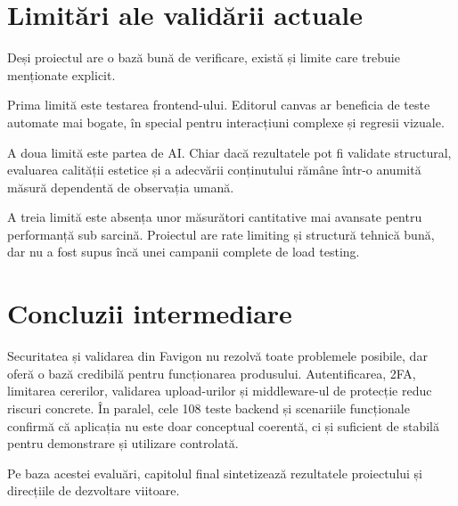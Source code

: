 \section{Limitări ale validării actuale}

Deși proiectul are o bază bună de verificare, există și limite care trebuie menționate explicit.

Prima limită este testarea frontend-ului. Editorul canvas ar beneficia de teste automate mai bogate, în special pentru interacțiuni complexe și regresii vizuale.

A doua limită este partea de AI. Chiar dacă rezultatele pot fi validate structural, evaluarea calității estetice și a adecvării conținutului rămâne într-o anumită măsură dependentă de observația umană.

A treia limită este absența unor măsurători cantitative mai avansate pentru performanță sub sarcină. Proiectul are rate limiting și structură tehnică bună, dar nu a fost supus încă unei campanii complete de load testing.

\section{Concluzii intermediare}

Securitatea și validarea din Favigon nu rezolvă toate problemele posibile, dar oferă o bază credibilă pentru funcționarea produsului. Autentificarea, 2FA, limitarea cererilor, validarea upload-urilor și middleware-ul de protecție reduc riscuri concrete. În paralel, cele 108 teste backend și scenariile funcționale confirmă că aplicația nu este doar conceptual coerentă, ci și suficient de stabilă pentru demonstrare și utilizare controlată.

Pe baza acestei evaluări, capitolul final sintetizează rezultatele proiectului și direcțiile de dezvoltare viitoare.


